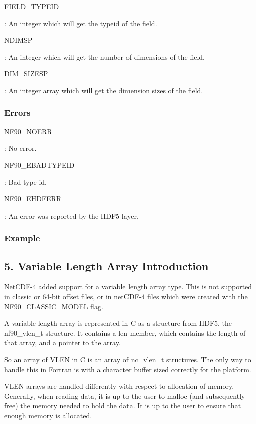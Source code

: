 {\ttfamily F\+I\+E\+L\+D\+\_\+\+T\+Y\+P\+E\+ID}

\+: An integer which will get the typeid of the field.

{\ttfamily N\+D\+I\+M\+SP}

\+: An integer which will get the number of dimensions of the field.

{\ttfamily D\+I\+M\+\_\+\+S\+I\+Z\+E\+SP}

\+: An integer array which will get the dimension sizes of the field.

\subsubsection*{Errors}

{\ttfamily N\+F90\+\_\+\+N\+O\+E\+RR}

\+: No error.

{\ttfamily N\+F90\+\_\+\+E\+B\+A\+D\+T\+Y\+P\+E\+ID}

\+: Bad type id.

{\ttfamily N\+F90\+\_\+\+E\+H\+D\+F\+E\+RR}

\+: An error was reported by the H\+D\+F5 layer.

\subsubsection*{Example}\hypertarget{f90-user-defined-data-types_f90-variable-length-array-introduction}{}\subsection{5. Variable Length Array Introduction }\label{f90-user-defined-data-types_f90-variable-length-array-introduction}
Net\+C\+D\+F-\/4 added support for a variable length array type. This is not supported in classic or 64-\/bit offset files, or in net\+C\+D\+F-\/4 files which were created with the N\+F90\+\_\+\+C\+L\+A\+S\+S\+I\+C\+\_\+\+M\+O\+D\+EL flag.

A variable length array is represented in C as a structure from H\+D\+F5, the nf90\+\_\+vlen\+\_\+t structure. It contains a len member, which contains the length of that array, and a pointer to the array.

So an array of V\+L\+EN in C is an array of nc\+\_\+vlen\+\_\+t structures. The only way to handle this in Fortran is with a character buffer sized correctly for the platform.

V\+L\+EN arrays are handled differently with respect to allocation of memory. Generally, when reading data, it is up to the user to malloc (and subsequently free) the memory needed to hold the data. It is up to the user to ensure that enough memory is allocated.

